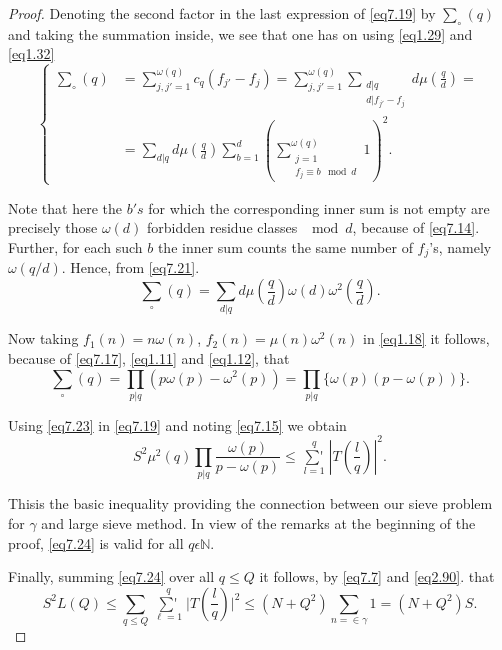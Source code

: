 \begin{proof}
Denoting the second factor in the last expression of \eqref{eq7.19} by
$\sum_\circ(q)$ and taking the  summation inside, we see that one has on
using \eqref{eq1.29} and \eqref{eq1.32} 
\begin{equation}
\begin{cases}
\sum_\circ (q) &= \sum \limits^{\omega (q)}_{j,j'=1} c_q(f_{j'} - f_j) =
\sum \limits^{\omega (q)}_{j,j'= 1} \sum\limits_{\substack{d|q
    \\ {d|f_{j'} - f_j}}} d \mu (\frac{q}{d})= \\ 
 &=\sum \limits_{d|q} d \mu (\frac{q}{d})\sum \limits^{d}_{b=1}
(\sum\limits^{\omega (q)}_{\substack{j=1\\ {f_j \equiv b \mod d}}}
1)^2. \tag{7.21}\label{eq7.21} 
\end{cases}
\end{equation}

Note that here the $b's$ for which the corresponding inner sum is not
empty are precisely those $\omega(d)$ forbidden residue classes $\mod
d$, because of \eqref{eq7.14}. Further, for each such $b$ the inner sum
counts the same number of $f_j$'s, namely $\omega(q/d)$. Hence, from
\eqref{eq7.21}. 
\begin{equation}
\sum_\circ (q) =\sum_{d|q} d \mu (\frac{q}{d}) \omega (d) \omega^2
(\frac{q}{d}). \tag{7.22}\label{eq7.22} 
\end{equation}

Now taking $f_1(n)=n \omega(n)$, $f_2(n)= \mu (n) \omega^2(n)$ in
\eqref{eq1.18} it follows, because of \eqref{eq7.17}, \eqref{eq1.11}
and \eqref{eq1.12}, that  
\begin{equation}
\sum_\circ (q)= \prod_{p|q}(p \omega(p) - \omega^2 (p)) = \prod_{p|q}\{
\omega (p)(p- \omega (p)) \}. \tag{7.23}\label{eq7.23} 
\end{equation}

Using \eqref{eq7.23} in \eqref{eq7.19} and noting \eqref{eq7.15} we
obtain 
\begin{equation}
S^2 \mu^2 (q)\prod_{p|q}\frac{\omega (p)}{p-\omega(p)} \leq
\mathop{\sum{}'}\limits^{q}_{l=1}|T(\frac{l}{q})|^2. \tag{7.24}\label{eq7.24} 
\end{equation}

This\pageoriginale is the basic inequality providing the connection
between our sieve problem for $\gamma$ and large sieve method. In view of the
remarks at the beginning of the proof, \eqref{eq7.24} is valid for all $q
\epsilon \mathbb{N}$. 

Finally, summing \eqref{eq7.24} over all $q \leq Q$ it follows, by
\eqref{eq7.7} and \eqref{eq2.90}. that 
\begin{equation}
S^2 L(Q)\leq \sum_{q \leq Q} \mathop{\sum{}'}\limits^{q}_{\ell
  =1}\Big|T(\frac{l}{q})\Big|^2 \leq (N + Q^2) \sum_{n = \in \gamma}1
=(N + Q^2)S. \tag{7.25}\label{eq7.25} 
\end{equation}


\end{proof}
